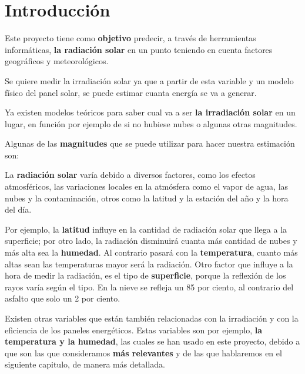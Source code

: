 \cleardoublepage

\chapter{Introducción}
\label{makereference}

Este proyecto tiene como \textbf{objetivo} predecir, a través de herramientas informáticas, \textbf{la radiación solar} en un punto teniendo en cuenta factores geográficos y meteorológicos.

Se quiere medir la irradiación solar ya que a partir de esta variable y un modelo físico del panel solar, se puede estimar cuanta energía se va a generar. 

Ya existen modelos teóricos para saber cual va a ser \textbf{la irradiación solar} en un lugar, en función por ejemplo de si no hubiese nubes o algunas otras magnitudes. 

Algunas de las\textbf{ magnitudes} que se puede utilizar para hacer nuestra estimación son:

La \textbf{radiación solar} varía debido a diversos factores, como los efectos atmosféricos, las variaciones locales en la atmósfera como el vapor de agua, las nubes y la contaminación, otros como la latitud y la estación del año y la hora del día.

Por ejemplo, la \textbf{latitud} influye en la cantidad de radiación solar que llega a la superficie; por otro lado, la radiación disminuirá cuanta más cantidad de nubes y más alta sea la \textbf{humedad}. Al contrario pasará con la \textbf{temperatura}, cuanto más altas sean las temperaturas mayor será la radiación. Otro factor que influye a la hora de medir la radiación, es el tipo de \textbf{superficie}, porque la reflexión de los rayos varía según el tipo. En la nieve se refleja un 85 por ciento, al contrario del asfalto que solo un 2 por ciento.

Existen otras variables que están también relacionadas con la irradiación y con la eficiencia de los paneles energéticos. Estas variables son por ejemplo, \textbf{la temperatura y la humedad}, las cuales se han usado en este proyecto, debido a que son las que consideramos \textbf{más relevantes} y de las que hablaremos en el siguiente capitulo, de manera más detallada.



